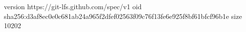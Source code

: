 version https://git-lfs.github.com/spec/v1
oid sha256:d3af8ec0e0c681ab24a965f2dfef02563f09c76f13fe6e925f8bf61bfcf96b1e
size 10202
